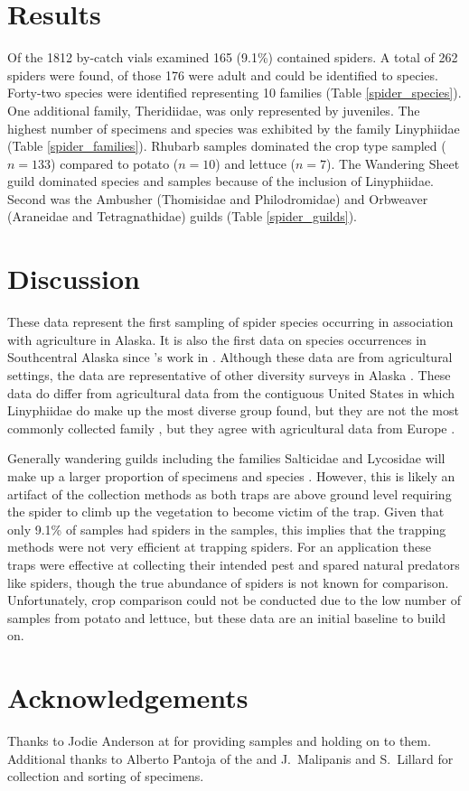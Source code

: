 \section{Results}
Of the 1812 by-catch vials examined 165 (9.1\%) contained spiders. A total of 262 spiders were found, of those 176 were adult and could be identified to species. Forty-two species were identified representing 10 families (Table \ref{spider_species}). One additional family, Theridiidae, was only represented by juveniles. The highest number of specimens and species was exhibited by the family Linyphiidae (Table \ref{spider_families}). Rhubarb samples dominated the crop type sampled ($n=133$) compared to potato ($n=10$) and lettuce ($n=7$). The Wandering Sheet guild dominated species and samples because of the inclusion of Linyphiidae. Second was the Ambusher (Thomisidae and Philodromidae) and Orbweaver (Araneidae and Tetragnathidae) guilds (Table \ref{spider_guilds}). 







\section{Discussion}

These data represent the first sampling of spider species occurring in association with agriculture in Alaska. It is also the first data on species occurrences in Southcentral Alaska since \citeauthor{ChamberlinIvie1947}’s work in \citeyear{ChamberlinIvie1947}. Although these data are from agricultural settings, the data are representative of other diversity surveys in Alaska \citep{Slowik2006, SlowikBlagoev2012, Sikesetal2013}.  These data do differ from agricultural data from the contiguous United States in which Linyphiidae do make up the most diverse group found, but they are not the most commonly collected family \citep{YoungEdwards1990}, but they agree with agricultural data from Europe \citep{NyffelerBirkhofer2017}. 

Generally wandering guilds including the families Salticidae and Lycosidae will make up a larger proportion of specimens and species \citep{YoungEdwards1990, Kerzicniketal2013}. However, this is likely an artifact of the collection methods as both traps are above ground level requiring the spider to climb up the vegetation to become victim of the trap. Given that only 9.1\% of samples had spiders in the samples, this implies that the trapping methods were not very efficient at trapping spiders. For an  application these traps were effective at collecting their intended pest and spared natural predators like spiders, though the true abundance of spiders is not known for comparison. Unfortunately, crop comparison could not be conducted due to the low number of samples from potato and lettuce, but these data are an initial baseline to build on. 

\section{Acknowledgements}

Thanks to Jodie Anderson at  for providing samples and holding on to them. Additional thanks to Alberto Pantoja of the  and J.\ Malipanis and S.\ Lillard for collection and sorting of specimens. 


